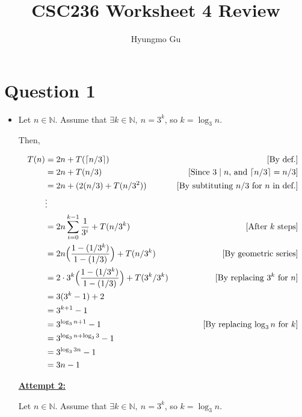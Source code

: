 \documentclass[12pt]{article}
\begin{document}
\title{CSC236 Worksheet 4 Review}
\author{Hyungmo Gu}
\maketitle

\section*{Question 1}
\begin{itemize}
    \item

    Let $n \in \mathbb{N}$. Assume that $\exists k \in \mathbb{N},\:n = 3^k$, so
    $k = \log_3 n$.

    \bigskip

    Then,

    \bigskip

    \begin{align}
        T(n) &= 2n + T(\lceil n/3 \rceil) & [\text{By def.}]\\
        &= 2n + T(n/3) & [\text{Since $3 \mid n$, and $\lceil n/3 \rceil = n/3$}]\\
        &= 2n + (2(n/3) + T(n/3^2)) & [\text{By subtituting $n/3$ for $n$ in def.}]\\
        &\vdots\\
        &=2n\sum\limits_{i=0}^{k-1} \frac{1}{3^i} + T(n/3^k) & [\text{After $k$ steps}]\\
        &=2n \Bigl( \frac{1 - (1/3^k)}{1 - (1/3)} \Bigr) + T(n/3^k) & [\text{By geometric series}]\\
        &=2 \cdot 3^k \Bigl( \frac{1 - (1/3^k)}{1 - (1/3)}  \Bigr) + T(3^k/3^k) & [\text{By replacing $3^k$ for $n$}]\\
        &=3(3^k - 1) + 2\\
        &=3^{k+1} - 1\\
        &=3^{\log_3 n + 1} - 1 & [\text{By replacing $\log_3 n$ for $k$}]\\
        &=3^{\log_3 n + \log_3 3} - 1\\
        &=3^{\log_3 3n} - 1\\
        &=3n - 1
    \end{align}

    \bigskip

    \begin{mdframed}
        \underline{\textbf{Attempt 2:}}

        \bigskip

        Let $n \in \mathbb{N}$. Assume that $\exists k \in \mathbb{N},\:n = 3^k$, so
        $k = \log_3 n$.


\end{mdframed}
\end{itemize}
\end{document}
